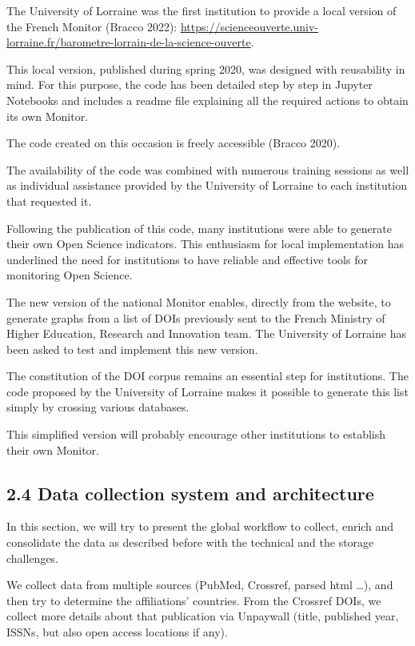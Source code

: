 \documentclass[
]{article}
\begin{document}
The University of Lorraine was the first institution to provide a local
version of the French Monitor (Bracco 2022):
\url{https://scienceouverte.univ-lorraine.fr/barometre-lorrain-de-la-science-ouverte}.

This local version, published during spring 2020, was designed with
reusability in mind. For this purpose, the code has been detailed step
by step in Jupyter Notebooks and includes a readme file explaining all
the required actions to obtain its own Monitor.

The code created on this occasion is freely accessible (Bracco 2020).

The availability of the code was combined with numerous training
sessions as well as individual assistance provided by the University of
Lorraine to each institution that requested it.

Following the publication of this code, many institutions were able to
generate their own Open Science indicators. This enthusiasm for local
implementation has underlined the need for institutions to have reliable
and effective tools for monitoring Open Science.

The new version of the national Monitor enables, directly from the
website, to generate graphs from a list of DOIs previously sent to the
French Ministry of Higher Education, Research and Innovation team. The
University of Lorraine has been asked to test and implement this new
version.

The constitution of the DOI corpus remains an essential step for
institutions. The code proposed by the University of Lorraine makes it
possible to generate this list simply by crossing various databases.

This simplified version will probably encourage other institutions to
establish their own Monitor.

\hypertarget{data-collection-system-and-architecture}{%
\subsection{2.4 Data collection system and
architecture}\label{data-collection-system-and-architecture}}

In this section, we will try to present the global workflow to collect,
enrich and consolidate the data as described before with the technical
and the storage challenges.

We collect data from multiple sources (PubMed, Crossref, parsed html
\ldots), and then try to determine the affiliations' countries. From the
Crossref DOIs, we collect more details about that publication via
Unpaywall (title, published year, ISSNs, but also open access locations
if any).
\end{document}
